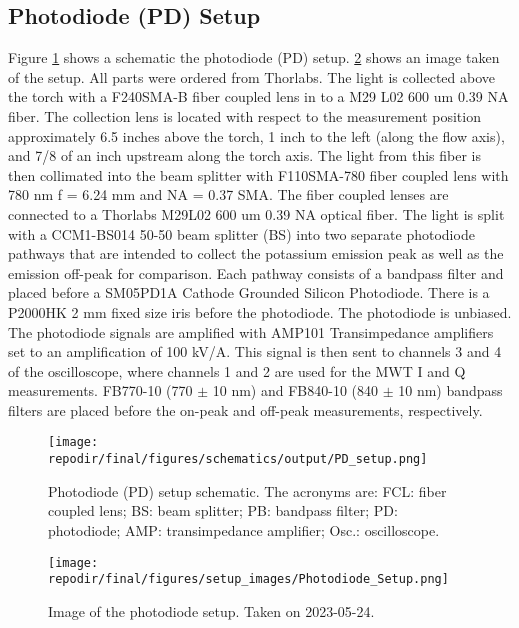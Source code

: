 \clearpage
\subsection{Photodiode (PD) Setup}

Figure \ref{fig:SI_PD_setup_schematic} shows a schematic the photodiode (PD) setup. \ref{fig:SI_PD_setup_image} shows an image taken of the setup. All parts were ordered from Thorlabs. The light is collected above the torch with a F240SMA-B fiber coupled lens in to a M29 L02 600 um 0.39 NA fiber. The collection lens is located with respect to the measurement position approximately 6.5 inches above the torch, 1 inch to the left (along the flow axis), and 7/8 of an inch upstream along the torch axis. The light from this fiber is  then collimated into the beam splitter with F110SMA-780 fiber coupled lens with 780 nm f = 6.24 mm and NA = 0.37 SMA. The fiber coupled lenses are connected to a Thorlabs M29L02 600 um 0.39 NA optical fiber. The light is split with a CCM1-BS014 50-50 beam splitter (BS) into two separate photodiode pathways that are intended to collect the potassium emission peak as well as the emission off-peak for comparison. Each pathway consists of a bandpass filter and placed before a SM05PD1A Cathode Grounded Silicon Photodiode. There is a P2000HK 2 mm fixed size iris before the photodiode. The photodiode is unbiased.   The photodiode signals are amplified with AMP101 Transimpedance amplifiers set to an amplification of 100 kV/A. This signal is then sent to channels 3 and 4 of the oscilloscope, where channels 1 and 2 are used for the MWT  I and Q measurements.  FB770-10 (770 $\pm$ 10 nm) and FB840-10 (840 $\pm$ 10 nm) bandpass filters are placed before the on-peak and off-peak measurements, respectively. 



\begin{figure}[]
    \centering
    \texttt{[image: \\repodir/final/figures/schematics/output/PD\_setup.png]}
    \caption{Photodiode (PD) setup schematic. The acronyms are: FCL: fiber coupled lens; BS: beam splitter; PB: bandpass filter; PD: photodiode; AMP: transimpedance amplifier; Osc.: oscilloscope.}
    \label{fig:SI_PD_setup_schematic}
\end{figure}



\begin{figure}[]
    \centering
    \texttt{[image: \\repodir/final/figures/setup\_images/Photodiode\_Setup.png]}
    \caption{Image of the photodiode setup. Taken on 2023-05-24. }
    \label{fig:SI_PD_setup_image}
\end{figure}

